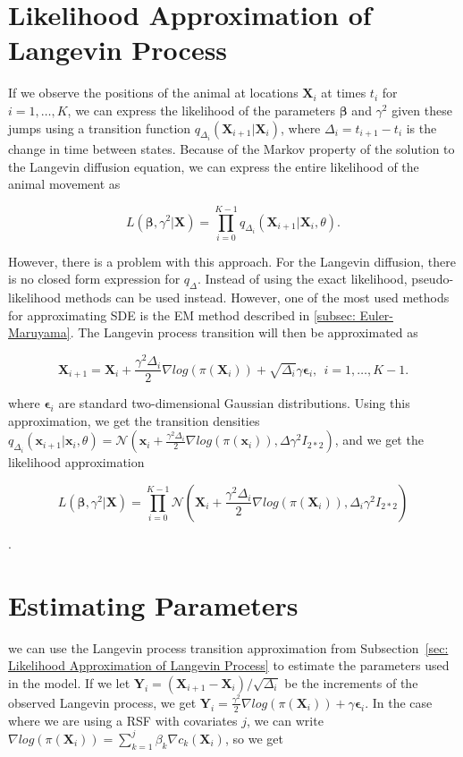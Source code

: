 \section{Likelihood Approximation of Langevin Process}
\label{sec: Likelihood Approximation of the Langevin Process}
If we observe the positions of the animal at locations $\textbf{X}_i$ at times $t_i$ for $i=1,\dots , K$, we can express the likelihood of the parameters $\bm{\beta}$ and $\gamma^2$ given these jumps using a transition function $q_{\Delta_i}(\textbf{X}_{i+1} | \textbf{X}_i)$, where $\Delta_i = t_{i+1} - t_i$ is the change in time between states. Because of the Markov property of the solution to the Langevin diffusion equation, we can express the entire likelihood of the animal movement as

\begin{equation}
    L(\bm{\beta}, \gamma^2 | \textbf{X}) = \prod_{i=0}^{K-1} q_{\Delta_i}(\textbf{X}_{i+1} | \textbf{X}_i, \theta).
    \label{eq: Langevin likelihood}
\end{equation}

However, there is a problem with this approach. For the Langevin diffusion, there is no closed form expression for $q_\Delta$\parencite{gloaguen_stochastic_2018}. Instead of using the exact likelihood, pseudo-likelihood methods can be used instead. However, one of the most used methods for approximating SDE is the EM method described in \ref{subsec: Euler-Maruyama}. The Langevin process transition will then be approximated as

$$
    \textbf{X}_{i+1} = \textbf{X}_i + \frac{\gamma^2 \Delta_i}{2}\nabla log(\pi(\textbf{X}_i)) + \sqrt{\Delta_i}\gamma \bm{\epsilon}_i, \ \ i = 1,\dots , K-1.
$$

where $\bm{\epsilon}_i$ are standard two-dimensional Gaussian distributions. Using this approximation, we get the transition densities $q_{\Delta_i}(\textbf{x}_{i+1} | \textbf{x}_i, \theta) = \mathcal{N}(\textbf{x}_i + \frac{\gamma^2 \Delta_i}{2}\nabla log(\pi(\textbf{x}_i)), \Delta \gamma^2 I_{2*2})$, and we get the likelihood approximation

$$L(\bm{\beta}, \gamma^2 | \textbf{X}) = \prod_{i=0}^{K-1} \mathcal{N}(\textbf{X}_i + \frac{\gamma^2 \Delta_i}{2}\nabla log(\pi(\textbf{X}_i)), \Delta_i \gamma^2 I_{2*2})$$

\parencite{iacus_simulation_2008}.






\section{Estimating Parameters}
\label{sec: estimating parameters}
we can use the Langevin process transition approximation from Subsection~\ref{sec: Likelihood Approximation of Langevin Process} to estimate the parameters used in the model. If we let $\textbf{Y}_i = (\textbf{X}_{i+1} - \textbf{X}_i)/\sqrt{\Delta_i}$ be the increments of the observed Langevin process, we get $\textbf{Y}_i = \frac{\gamma^2}{2}\nabla log(\pi(\textbf{X}_i)) + \gamma \bm \epsilon_i$. In the case where we are using a RSF with covariates $j$, we can write $\nabla log(\pi(\textbf{X}_i)) = \sum_{k = 1}^j \beta_k \nabla c_k(\textbf{X}_i)$, so we get

